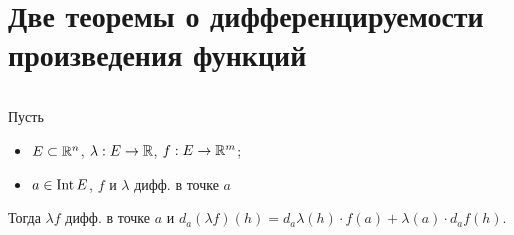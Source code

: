 \section{Две теоремы о дифференцируемости произведения функций}


\begin{theorem} $ $

    Пусть 
    \begin{itemize}
        \item $E \subset \mathbb{R}^n$, $\lambda : E \to \mathbb{R}$, $f : E \to \mathbb{R}^m$;
        \item $a \in \operatorname{Int} E$, $f$ и $\lambda$ дифф. в точке $a$
    \end{itemize}
    Тогда $\lambda f$ дифф. в точке $a$ и $d_a (\lambda f)(h)
    = d_a \lambda (h) \cdot f(a) + \lambda(a) \cdot d_a f(h)$.
\end{theorem}
